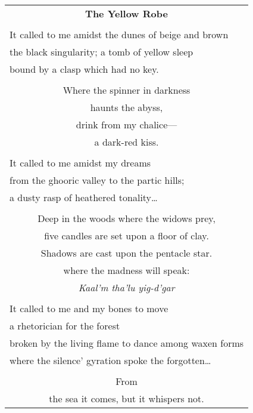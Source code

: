 \documentclass{article}
\begin{document}
\newcommand{\h}{\hspace*{4ex}}

\begin{center}
\begin{tabular}{l}
\multicolumn{1}{c}{\large\textbf{The Yellow Robe}} \\
\\
It called to me amidst the dunes of beige and brown \\
the black singularity; a tomb of yellow sleep \\
bound by a clasp which had no key. \\
\\
\multicolumn{1}{c}{Where the spinner in darkness} \\
\multicolumn{1}{c}{haunts the abyss,} \\
\multicolumn{1}{c}{drink from my chalice---} \\
\multicolumn{1}{c}{a dark-red kiss.} \\
\\
It called to me amidst my dreams \\
from the ghooric valley to the partic hills; \\
a dusty rasp of heathered tonality\ldots{} \\
\\
\multicolumn{1}{c}{Deep in the woods where the widows prey,} \\
\multicolumn{1}{c}{five candles are set upon a floor of clay.} \\
\multicolumn{1}{c}{Shadows are cast upon the pentacle star.} \\
\multicolumn{1}{c}{where the madness will speak:} \\
\multicolumn{1}{c}{
	\textit{Kaal'm tha'lu yig-d'gar} %
} \\
\\
It called to me and my bones to move \\
a rhetorician for the forest \\
broken by the living flame to dance among waxen forms \\
where the silence' gyration spoke the forgotten\ldots{} \\
\\
\multicolumn{1}{c}{From} \\
\multicolumn{1}{c}{the sea it comes, but it whispers not.} \\

\end{tabular}
\end{center}
\end{document}
